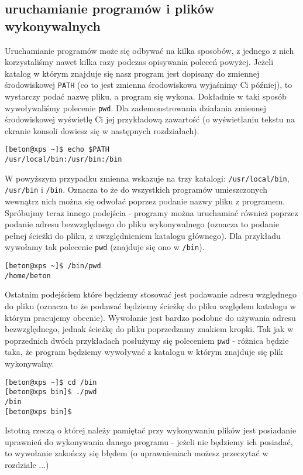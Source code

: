 \documentclass[10 pt, a4paper, draft]{report}
\begin{document}
\subsection{uruchamianie programów i plików wykonywalnych}
Uruchamianie programów może się odbywać na kilka sposobów, z jednego z nich korzystaliśmy nawet kilka razy podczas opisywania poleceń powyżej. Jeżeli katalog w którym znajduje się nasz program jest dopisany do zmiennej środowiskowej \texttt{PATH} (co to jest zmienna środowiskowa wyjaśnimy Ci później), to wystarczy podać nazwę pliku, a program się wykona. Dokładnie w taki sposób wywoływaliśmy polecenie \texttt{pwd}. Dla zademonstrowania działania zmiennej środowiskowej wyświetlę Ci jej przykładową zawartość (o wyświetlaniu tekstu na ekranie konsoli dowiesz się w następnych rozdziałach).
\begin{verbatim}
[beton@xps ~]$ echo $PATH
/usr/local/bin:/usr/bin:/bin
\end{verbatim}
W powyższym przypadku zmienna wskazuje na trzy katalogi: \texttt{/usr/local/bin}, \texttt{/usr/bin} i \texttt{/bin}. Oznacza to że do wszystkich programów umieszczonych wewnątrz nich można się odwołać poprzez podanie nazwy pliku z programem.
\newline
Spróbujmy teraz innego podejścia - programy można uruchamiać również poprzez podanie adresu bezwzględnego do pliku wykonywalnego (oznacza to podanie pełnej ścieżki do pliku, z uwzględnieniem katalogu głównego). Dla przykładu wywołamy tak polecenie \texttt{pwd} (znajduje się ono w \texttt{/bin}).
\begin{verbatim}
[beton@xps ~]$ /bin/pwd
/home/beton
\end{verbatim}
Ostatnim podejściem które będziemy stosować jest podawanie adresu względnego do pliku (oznacza to że podawać będziemy ścieżkę do pliku względem katalogu w którym pracujemy obecnie). Wywołanie jest bardzo podobne do używania adresu bezwzględnego, jednak ścieżkę do pliku poprzedzamy znakiem kropki. Tak jak w poprzednich dwóch przykładach posłużymy się poleceniem \texttt{pwd} - różnica będzie taka, że program będziemy wywoływać z katalogu w którym znajduje się plik wykonywalny.
\begin{verbatim}
[beton@xps ~]$ cd /bin
[beton@xps bin]$ ./pwd 
/bin
[beton@xps bin]$ 
\end{verbatim}
Istotną rzeczą o której należy pamiętać przy wykonywaniu plików jest posiadanie uprawnień do wykonywania danego programu - jeżeli nie będziemy ich posiadać, to wywołanie zakończy się błędem (o uprawnieniach możesz przeczytać w rozdziale ...) %
\end{document}
